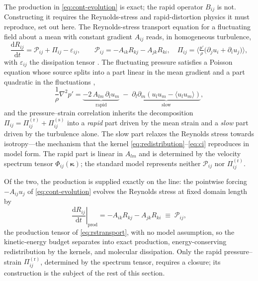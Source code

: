 \documentclass[lineno]{JFM-FLM_Au}
\begin{document}
The production in \eqref{eq:cont-evolution} is exact; the rapid operator
$B_{ij}$ is not. Constructing it requires the Reynolds-stress and
rapid-distortion physics it must reproduce, set out here. The
Reynolds-stress transport equation for a fluctuating field about a
mean with constant gradient $A_{ij}$ reads, in homogeneous turbulence,
\begin{equation}
  \frac{\mathrm{d}R_{ij}}{\mathrm{d}t}
  = \mathcal{P}_{ij} + \Pi_{ij} - \varepsilon_{ij},
  \qquad
  \mathcal{P}_{ij}=-A_{ik}R_{kj}-A_{jk}R_{ki},
  \quad
  \Pi_{ij}=\Big\langle \tfrac{p'}{\rho}
            \big(\partial_j u_i+\partial_i u_j\big)\Big\rangle,
  \label{eq:rstransport}
\end{equation}
with $\varepsilon_{ij}$ the dissipation tensor \citep{Pope2000}. The
fluctuating pressure satisfies a Poisson equation whose source splits
into a part linear in the mean gradient and a part quadratic in the
fluctuations \citep{Pope2000},
\begin{equation}
  \frac{1}{\rho}\nabla^2 p'
  = \underbrace{-2\,A_{lm}\,\partial_l u_m}_{\text{rapid}}
    \;-\;
    \underbrace{\partial_l\partial_m\!\left(u_l u_m
     -\langle u_l u_m\rangle\right)}_{\text{slow}} ,
  \label{eq:poisson}
\end{equation}
and the pressure--strain correlation inherits the decomposition
$\Pi_{ij}=\Pi^{(\mathrm r)}_{ij}+\Pi^{(\mathrm s)}_{ij}$ into a
\emph{rapid} part driven by the mean strain and a \emph{slow} part driven
by the turbulence alone. The slow part relaxes the Reynolds stress
towards isotropy---the mechanism that the kernel
\eqref{eq:redistribution}--\eqref{eq:ci} reproduces in model form. The
rapid part is linear in $A_{lm}$ and is determined by the velocity
spectrum tensor $\Phi_{ij}(\boldsymbol{\kappa})$; the standard model
represents neither $\mathcal{P}_{ij}$ nor $\Pi^{(\mathrm r)}_{ij}$.

Of the two, the production is supplied exactly on the line: the
pointwise forcing $-A_{ij}u_j$ of \eqref{eq:cont-evolution} evolves the
Reynolds stress at fixed domain length by
\begin{equation}
  \left.\frac{\mathrm{d}R_{ij}}{\mathrm{d}t}\right|_{\text{prod}}
  = -A_{ik}R_{kj}-A_{jk}R_{ki}
  \;\equiv\; \mathcal{P}_{ij},
  \label{eq:production-rate}
\end{equation}
the production tensor of \eqref{eq:rstransport}, with no model
assumption, so the kinetic-energy budget separates into exact
production, energy-conserving redistribution by the kernels, and
molecular dissipation. Only the rapid pressure--strain
$\Pi^{(\mathrm r)}_{ij}$, determined by the spectrum tensor, requires a
closure; its construction is the subject of the rest of this section.
\end{document}
